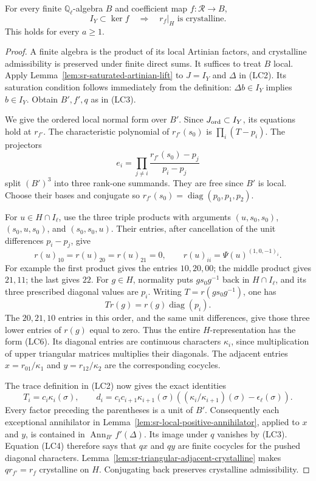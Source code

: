 \begin{srproposition}\label{prop:sr-ordinary-saturation-crystalline}
For every finite \(\mathbb Q_\ell\)-algebra \(B\) and
coefficient map \(f:\mathcal R\to B\),
\[
       I_Y\subset\ker f
       \quad\Longrightarrow\quad
       r_f|_H\text{ is crystalline}.
 \tag{LC8}
\]
This holds for every \(a\ge1\).
\end{srproposition}
\begin{proof}
A finite algebra is the product of its local Artinian
factors, and crystalline admissibility is preserved under
finite direct sums. It suffices to treat \(B\) local.
Apply Lemma~\ref{lem:sr-saturated-artinian-lift} to
\(J=I_Y\) and \(\Delta\) in (LC2).
Its saturation condition follows immediately from the definition:
\(\Delta b\in I_Y\) implies \(b\in I_Y\).
Obtain \(B',f',q\) as in (LC3).

We give the ordered local normal form over \(B'\).
Since \(J_{\rm ord}\subset I_Y\), its equations hold
at \(r_{f'}\).
The characteristic polynomial of \(r_{f'}(s_0)\) is
\(\prod_i(T-p_i)\).
The projectors
\[
                 e_i=\prod_{j\ne i}
                   \frac{r_{f'}(s_0)-p_j}{p_i-p_j}
\]
split \((B')^3\) into three rank-one summands.
They are free since \(B'\) is local.
Choose their bases and conjugate so
\(r_{f'}(s_0)=\operatorname{diag}(p_0,p_1,p_2)\).

For \(u\in H\cap I_\ell\), use the three triple products
with arguments \((u,s_0,s_0)\), \((s_0,u,s_0)\),
and \((s_0,s_0,u)\).
Their entries, after cancellation of the unit differences
\(p_i-p_j\), give
\[
 r(u)_{10}=r(u)_{20}=r(u)_{21}=0,\qquad
 r(u)_{ii}=\Psi(u)^{(1,0,-1)_i}.
 \tag{LC9}
\]
For example the first product gives the entries \(10,20,00\);
the middle product gives \(21,11\); the last gives \(22\).
For \(g\in H\), normality puts
\(gs_0g^{-1}\) back in \(H\cap I_\ell\), and its three
prescribed diagonal values are \(p_i\).
Writing \(T=r(gs_0g^{-1})\), one has
\[
                     T r(g)=r(g)\operatorname{diag}(p_i).
\]
The \(20,21,10\) entries in this order, and the same unit
differences, give those three lower entries of \(r(g)\)
equal to zero.
Thus the entire \(H\)-representation has the form (LC6).
Its diagonal entries are continuous characters
\(\kappa_i\), since multiplication of upper triangular
matrices multiplies their diagonals.
The adjacent entries \(x=r_{01}/\kappa_1\) and
\(y=r_{12}/\kappa_2\) are the corresponding cocycles.

The trace definition in (LC2) now gives the exact identities
\[
 T_i=c_i\kappa_i(\sigma),\qquad
 d_i=c_ic_{i+1}\kappa_{i+1}(\sigma)
       \left((\kappa_i/\kappa_{i+1})(\sigma)
                                     -\epsilon_\ell(\sigma)\right).
 \tag{LC10}
\]
Every factor preceding the parentheses is a unit of \(B'\).
Consequently each exceptional annihilator in
Lemma~\ref{lem:sr-local-positive-annihilator}, applied to
\(x\) and \(y\), is contained in
\(\operatorname{Ann}_{B'}f'(\Delta)\).
Its image under \(q\) vanishes by (LC3).
Equation (LC4) therefore says that \(q x\) and \(q y\)
are finite cocycles for the pushed diagonal characters.
Lemma~\ref{lem:sr-triangular-adjacent-crystalline}
makes \(q r_{f'}=r_f\) crystalline on \(H\).
Conjugating back preserves crystalline admissibility.


\end{proof}
